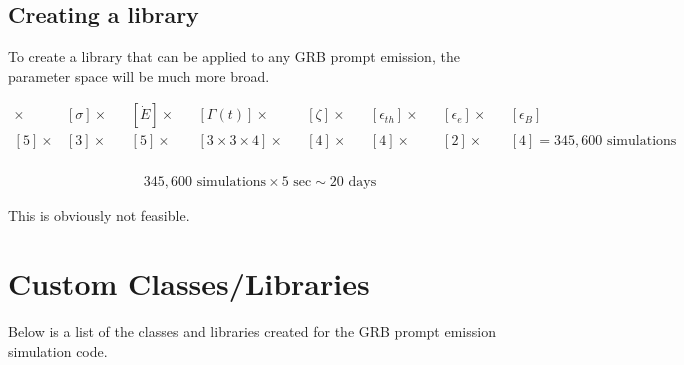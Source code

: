 \documentclass[linenumbers,twocolumn]{aastex631}
\begin{document}
\begin{appendix}
\subsection{Creating a library}

To create a library that can be applied to any GRB prompt emission, the parameter space will be much more broad. 

\begin{align}
	[t_w] \times &[\sigma] \times &&[\dot{E}] \times&&[\Gamma(t)] \times&&[\zeta] \times&&[\epsilon_{th}] \times&&[\epsilon_{e}] \times&&[\epsilon_{B}] \\ 
	[5] \times &[3] \times &&[5] \times&&[3\times3\times4] \times&&[4] \times&&[4] \times&&[2] \times&&[4] = 345,600 \text{ simulations} \\
\end{align}

\begin{align}
	345,600 \text{ simulations} \times 5 \text{ sec} \sim 20 \text{ days}
\end{align}

This is obviously not feasible.

\section{Custom Classes/Libraries}

Below is a list of the classes and libraries created for the GRB prompt emission simulation code.


\end{appendix}
\end{document}
